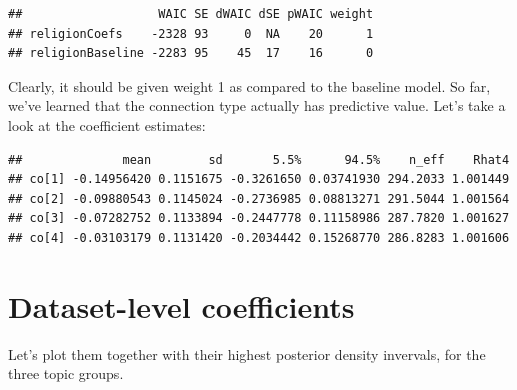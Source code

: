 \documentclass[
  12pt,
]{book}
\begin{document}
\vspace{1mm}
\footnotesize

\begin{verbatim}
##                   WAIC SE dWAIC dSE pWAIC weight
## religionCoefs    -2328 93     0  NA    20      1
## religionBaseline -2283 95    45  17    16      0
\end{verbatim}

\normalsize

Clearly, it should be given weight 1 as compared to the baseline model. So far, we've learned that the connection type actually has predictive value. Let's take a look at the coefficient estimates:

\vspace{1mm}
\footnotesize

\begin{verbatim}
##              mean        sd       5.5%      94.5%    n_eff    Rhat4
## co[1] -0.14956420 0.1151675 -0.3261650 0.03741930 294.2033 1.001449
## co[2] -0.09880543 0.1145024 -0.2736985 0.08813271 291.5044 1.001564
## co[3] -0.07282752 0.1133894 -0.2447778 0.11158986 287.7820 1.001627
## co[4] -0.03103179 0.1131420 -0.2034442 0.15268770 286.8283 1.001606
\end{verbatim}

\normalsize

\hypertarget{dataset-level-coefficients}{%
\section{Dataset-level coefficients}\label{dataset-level-coefficients}}

\noindent Let's plot them together with their highest posterior density invervals, for the three topic groups.
\end{document}
